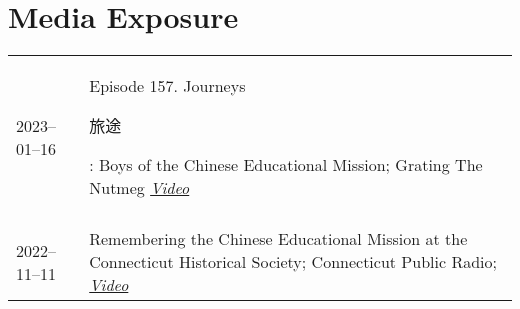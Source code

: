 \documentclass[letterpaper,11pt, english]{article}
\begin{document}
\section{Media Exposure}
\begin{flushleft}
  \begin{tabularx}{\textwidth}{@{}lX@{}}
      2023--01--16 \hspace{1cm} & Episode 157. Journeys \begin{CJK*}{UTF8}{gbsn}旅途\end{CJK*}: Boys of the Chinese Educational Mission; Grating The Nutmeg \emph{\href{https://gratingthenutmeg.libsyn.com/157-journeys-boys-of-the-chinese-educational-mission }{\color{blue}Video}}\\ 
      \\[-0.2cm] 
      2022--11--11 \hspace{1cm} & Remembering the Chinese Educational Mission at the Connecticut Historical Society; Connecticut Public Radio; \emph{\href{https://www.ctpublic.org/show/where-we-live/2022-11-11/remembering-the-chinese-educational-mission-at-the-connecticut-historical-society}{\color{blue}Video}}\\
  \end{tabularx}
\end{flushleft}
\end{document}
